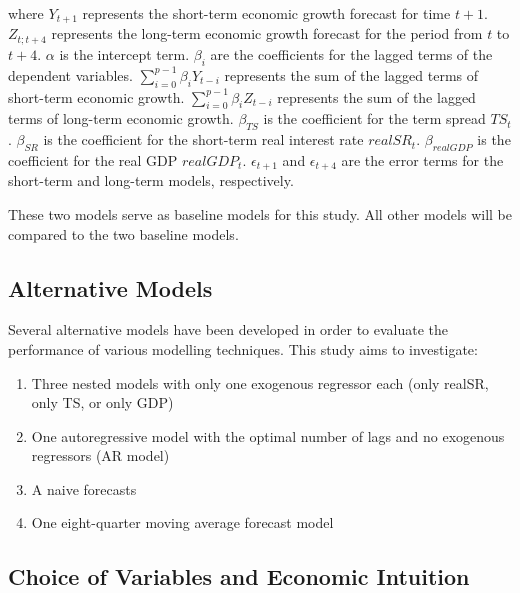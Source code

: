 \documentclass[12pt]{article}
\begin{document}
where \( Y_{t+1} \) represents the short-term economic growth forecast for time \( t+1 \).
    \( Z_{t;t+4} \) represents the long-term economic growth forecast for the period from \( t \) to \( t+4 \).
     \( \alpha \) is the intercept term.
     \( \beta_i \) are the coefficients for the lagged terms of the dependent variables.
     \( \sum_{i=0}^{p-1} \beta_i Y_{t-i} \) represents the sum of the lagged terms of short-term economic growth.
     \( \sum_{i=0}^{p-1} \beta_i Z_{t-i} \) represents the sum of the lagged terms of long-term economic growth.
    \( \beta_{TS} \) is the coefficient for the term spread \( TS_t \).
    \( \beta_{SR} \) is the coefficient for the short-term real interest rate \( realSR_t \).
     \( \beta_{realGDP} \) is the coefficient for the real GDP \( realGDP_t \).
    \( \epsilon_{t+1} \) and \( \epsilon_{t+4} \) are the error terms for the short-term and long-term models, respectively.

    
These two models serve as baseline models for this study. All other models will be compared to the two baseline models.

\subsection{Alternative Models}

Several alternative models have been developed in order to evaluate the performance of various modelling techniques. This study aims to investigate:

\begin{enumerate}
    \item Three nested models with only one exogenous regressor each (only realSR, only TS, or only GDP)
    \item One autoregressive model with the optimal number of lags and no exogenous regressors (AR model)
    \item A naive forecasts
    \item One eight-quarter moving average forecast model
\end{enumerate}

\subsection{Choice of Variables and Economic Intuition}
\end{document}
